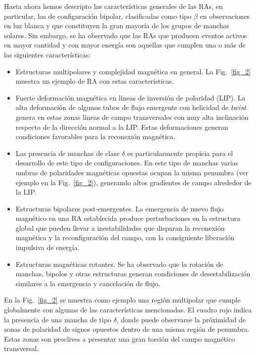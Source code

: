 \documentclass[baaa]{baaa}
\begin{document}
Hasta ahora hemos descripto las características generales de las RAs, en particular, las de configuración bipolar, clasificadas como tipo $\beta$ en observaciones en luz blanca y que constituyen la gran mayoría de los grupos de manchas solares. Sin embargo, se ha observado que las RAs que producen eventos activos en mayor cantidad y con mayor energía \citep[ver p. ej.,][]{toriumi2019} son aquellas que cumplen una o más de las siguientes características:
\begin{itemize}

\item Estructuras multipolares y complejidad magnética en general. La Fig.~\ref{fig_2} muestra un ejemplo de RA con estas características.
\item Fuerte deformación magnética en líneas de inversión de polaridad (LIP). La alta deformación de algunos tubos de flujo emergente con helicidad de $\sl twist$ genera en estas zonas líneas de campo transversales con muy alta inclinación respecto de la dirección normal a la LIP. Estas deformaciones generan condiciones favorables para la reconexión magnética. 
\item Las presencia de manchas de clase $\delta$ es particularmente propicia para el desarrollo de este tipo de configuraciones. En este tipo de manchas varias umbras de polaridades magnéticas opuestas ocupan la misma penumbra (ver ejemplo en la Fig.~\ref{fig_2}), generando altos gradientes de campo alrededor de la LIP.
\item Estructuras bipolares post-emergentes. La emergencia de nuevo flujo magnético en una RA establecida produce perturbaciones en la estructura global que pueden llevar a inestabilidades que disparan la reconexión magnética y la reconfiguración del campo, con la consiguiente liberación impulsiva de energía.
\item Estructuras magnéticas rotantes. Se ha observado que la rotación de manchas, bipolos y otras estructuras generan condiciones de desestabilización similares a la emergencia y cancelación de flujo.
\end{itemize}

En la Fig.~\ref{fig_2} se muestra como ejemplo una región multipolar que cumple globalmente con algunas de las características mencionadas. El cuadro rojo indica la presencia de una mancha de tipo $\delta$, donde puede observarse la próximidad de zonas de polaridad de signos opuestos dentro de una misma región de penumbra. Estas zonas son proclives a presentar una gran torsión del campo magnético transversal.
\end{document}
